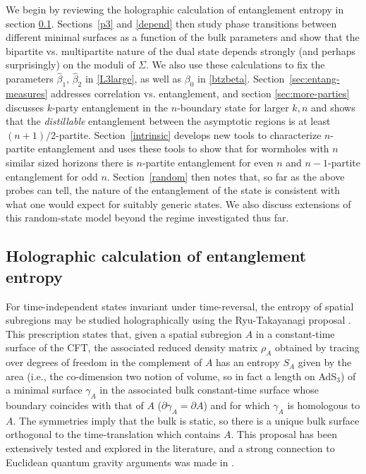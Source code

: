 \documentclass[12pt]{article}
\numberwithin{equation}{section}
\begin{document}
We begin by reviewing the holographic calculation of entanglement entropy in section \ref{hrt}.   Sections~\ref{p3} and \ref{depend} then study phase transitions between different minimal surfaces as a function of the bulk parameters and show that the bipartite vs. multipartite nature of the dual state depends strongly (and perhaps surprisingly) on the moduli of $\Sigma$.   We also use these calculations to fix the parameters $\hat \beta_1$, $\hat \beta_2$ in \eqref{L3large}, as well as $\beta_0$ in \eqref{btzbeta}. Section~\ref{sec:entang-measures} addresses correlation vs. entanglement, and section \ref{sec:more-parties} discusses $k$-party entanglement in the $n$-boundary state for larger $k, n$ and shows that the {\it distillable} entanglement between the asymptotic regions is at least $(n+1)/2$-partite.
Section~\ref{intrinsic} develops new tools to characterize $n$-partite entanglement and uses these tools to show that for wormholes with $n$ similar sized horizons there is $n$-partite entanglement for even $n$ and $n-1$-partite entanglement for odd $n$.  Section~\ref{random} then notes that, so far as the above probes can tell, the nature of the entanglement of the state is consistent with what one would expect for suitably generic states.  We also discuss extensions of this random-state model beyond the regime investigated thus far.

\subsection{Holographic calculation of entanglement entropy}
\label{hrt}

For time-independent states invariant under time-reversal, the entropy of spatial subregions may be studied holographically using the Ryu-Takayanagi proposal \cite{Ryu:2006bv}.  This prescription states that, given a spatial subregion $A$ in a constant-time surface of the CFT, the associated reduced density matrix $\rho_A$ obtained by tracing over degrees of freedom in the complement of $A$ has an entropy $S_A$ given by the area (i.e., the co-dimension two notion of volume, so in fact a length on AdS${}_3$) of a minimal surface $\gamma_A$ in the associated bulk constant-time surface whose boundary coincides with that of $A$ ($\partial \gamma_A = \partial A$) and for which $\gamma_A$ is homologous to $A$.  The symmetries imply that the bulk is static, so there is a unique bulk surface orthogonal to the time-translation which contains $A$.  This proposal has been extensively tested and explored in the literature, and a strong connection to Euclidean quantum gravity arguments was made in \cite{Lewkowycz:2013nqa}.
\end{document}

